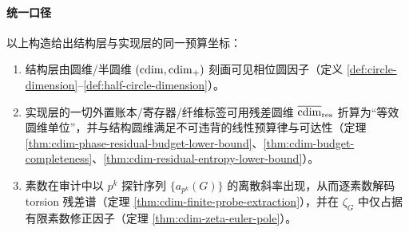 
\paragraph{统一口径}
以上构造给出结构层与实现层的同一预算坐标：
\begin{enumerate}
  \item 结构层由圆维/半圆维 \((\operatorname{cdim},\operatorname{cdim}_+)\) 刻画可见相位圆因子（定义 \ref{def:circle-dimension}--\ref{def:half-circle-dimension}）。
  \item 实现层的一切外置账本/寄存器/纤维标签可用残差圆维 \(\overline{\operatorname{cdim}}_{\mathrm{res}}\) 折算为“等效圆维单位”，并与结构圆维满足不可违背的线性预算律与可达性（定理 \ref{thm:cdim-phase-residual-budget-lower-bound}、\ref{thm:cdim-budget-completeness}、\ref{thm:cdim-residual-entropy-lower-bound}）。
  \item 素数在审计中以 \(p^k\) 探针序列 \(\{a_{p^k}(G)\}\) 的离散斜率出现，从而逐素数解码 torsion 残差谱（定理 \ref{thm:cdim-finite-probe-extraction}），并在 \(\zeta_G\) 中仅占据有限素数修正因子（定理 \ref{thm:cdim-zeta-euler-pole}）。
\end{enumerate}

\endinput
